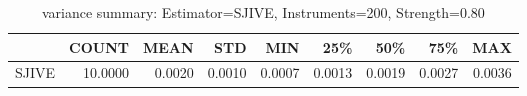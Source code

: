\begin{table}[ht]
\centering
\caption{variance summary: Estimator=SJIVE, Instruments=200, Strength=0.80}
\begin{tabular}{lrrrrrrrr}
\toprule
 & COUNT & MEAN & STD & MIN & 25\% & 50\% & 75\% & MAX \\
\midrule
SJIVE & 10.0000 & 0.0020 & 0.0010 & 0.0007 & 0.0013 & 0.0019 & 0.0027 & 0.0036 \\
\bottomrule
\end{tabular}
\end{table}
